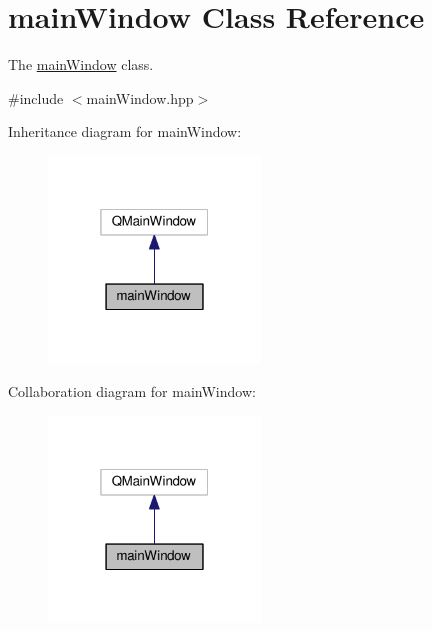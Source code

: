 \hypertarget{classmainWindow}{}\section{main\+Window Class Reference}
\label{classmainWindow}


The \hyperlink{classmainWindow}{main\+Window} class.  




{\ttfamily \#include $<$main\+Window.\+hpp$>$}



Inheritance diagram for main\+Window\+:
\nopagebreak
\begin{figure}[H]
\begin{center}
\leavevmode
\includegraphics[width=160pt]{classmainWindow__inherit__graph}
\end{center}
\end{figure}


Collaboration diagram for main\+Window\+:
\nopagebreak
\begin{figure}[H]
\begin{center}
\leavevmode
\includegraphics[width=160pt]{classmainWindow__coll__graph}
\end{center}
\end{figure}
